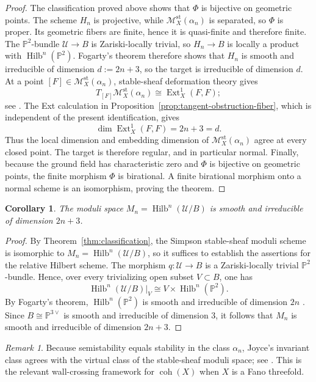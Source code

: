 \documentclass[12pt]{amsart}
\numberwithin{equation}{section}
\newcommand{\PP}{\mathbb{P}}
\newcommand{\M}{\mathcal{M}}
\newcommand{\Hilb}{\operatorname{Hilb}}
\newcommand{\Ext}{\operatorname{Ext}}
\newcommand{\dual}{\vee}
\theoremstyle{plain}
\newtheorem{corollary}[theorem]{Corollary}
\theoremstyle{definition}
\theoremstyle{remark}
\newtheorem{remark}[theorem]{Remark}
\begin{document}
\begin{proof}
The classification proved above shows that $\Phi$ is bijective on geometric points.
The scheme $H_n$ is projective, while $\M_X^{\mathrm{st}}(\alpha_n)$ is separated, so $\Phi$ is proper.
Its geometric fibers are finite, hence it is quasi-finite and therefore finite.
The $\PP^2$-bundle $\mathcal U\to B$ is Zariski-locally trivial, so $H_n\to B$ is locally a product with $\Hilb^n(\PP^2)$.
Fogarty's theorem therefore shows that $H_n$ is smooth and irreducible of dimension $d:=2n+3$, so the target is irreducible of dimension $d$.
At a point $[F]\in\M_X^{\mathrm{st}}(\alpha_n)$, stable-sheaf deformation theory gives
\[
T_{[F]}\M_X^{\mathrm{st}}(\alpha_n)\cong\Ext^1_X(F,F);
\]
see \cite[Proposition~3.26]{Thomas}.
The Ext calculation in Proposition~\ref{prop:tangent-obstruction-fiber}, which is independent of the present identification, gives
\[
\dim\Ext^1_X(F,F)=2n+3=d.
\]
Thus the local dimension and embedding dimension of $\M_X^{\mathrm{st}}(\alpha_n)$ agree at every closed point.
The target is therefore regular, and in particular normal.
Finally, because the ground field has characteristic zero and $\Phi$ is bijective on geometric points, the finite morphism $\Phi$ is birational.
A finite birational morphism onto a normal scheme is an isomorphism, proving the theorem.
\end{proof}

\begin{corollary}\label{cor:smooth-moduli}
The moduli space $M_n=\Hilb^n(\mathcal U/B)$ is smooth and irreducible of dimension $2n+3$.
\end{corollary}

\begin{proof}
By Theorem~\ref{thm:classification}, the Simpson stable-sheaf moduli scheme is isomorphic to $M_n=\Hilb^n(\mathcal U/B)$, so it suffices to establish the assertions for the relative Hilbert scheme.
The morphism $q\colon \mathcal U\to B$ is a Zariski-locally trivial $\PP^2$-bundle.
Hence, over every trivializing open subset $V\subset B$, one has
\[
\Hilb^n(\mathcal U/B)|_V\cong V\times \Hilb^n(\PP^2).
\]
By Fogarty's theorem, $\Hilb^n(\PP^2)$ is smooth and irreducible of dimension $2n$ \cite{Fogarty}.
Since $B\cong\PP^{3\dual}$ is smooth and irreducible of dimension $3$, it follows that $M_n$ is smooth and irreducible of dimension $2n+3$.
\end{proof}

\begin{remark}\label{rem:joyce}
Because semistability equals stability in the class $\alpha_n$, Joyce's invariant class agrees with the virtual class of the stable-sheaf moduli space; see \cite{JoyceAbelian,Thomas}. This is the relevant wall-crossing framework for $\operatorname{coh}(X)$ when $X$ is a Fano threefold.
\end{remark}
\end{document}
